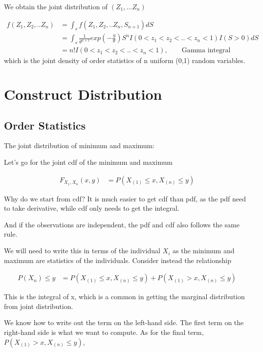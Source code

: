 \documentclass[11pt]{article} %
\begin{document}
We obtain the joint distribution of $(Z_1, ... Z_n)$

\begin{align*}
	f(Z_1, Z_2,.. Z_{n}) &= \int_{s} f(Z_1, Z_2,.. Z_{n}, S_{n+1}) dS \\
	&= \int_{s} \frac{1}{\theta^{n+1}} exp(-\frac{S}{\theta}) S^{n} I(0< z_1 < z_2 <.. <z_n < 1) I(S > 0) dS\\
	&= n! I(0< z_1 < z_2 <.. <z_n < 1), \qquad \text{Gamma integral}
\end{align*}
which is the joint density of order statistics of n uniform (0,1) random variables.




\section{Construct Distribution}

\subsection{Order Statistics}
The joint distribution of minimum and maximum:

Let's go for the joint cdf of the minimum and maximum 

\begin{align*}
	F_{X_{1}, X_{n}} (x, y) &= P(X_{(1)} \leq x, X_{(n)} \leq y)  
\end{align*}

Why do we start from cdf? It is much easier to get cdf than pdf, as the pdf need to take derivative, while cdf only needs to get the integral.

And if the observations are independent, the pdf and cdf also follows the same rule. 

We will need to write this in terms of the individual $X_i$ as the minimum and maximum are statistics of the individuals. Consider instead the relationship

\begin{align*}
	P{(X_{n}) \leq y} &= P(X_{(1)} \leq x, X_{(n)} \leq y) + P(X_{(1)} > x, X_{(n)} \leq y)
\end{align*}

This is the integral of x, which is a common in getting the marginal distribution from joint distribution.

We know how to write out the term on the left-hand side. The first term on the right-hand side is what we want to compute. As for the final term, $P(X_{(1)} > x, X_{(n)} \leq y)$,
\end{document}
